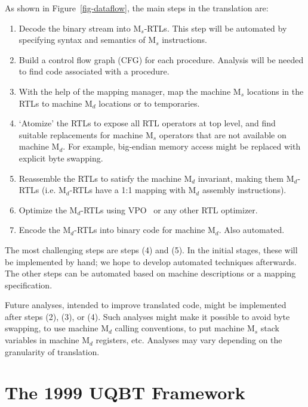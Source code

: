 As shown in Figure~\ref{fig-dataflow}, the main steps in the translation are:
\begin{enumerate}
\item Decode the binary stream into M$_s$-RTLs.  This step will be
     automated by specifying syntax and semantics of M$_s$ instructions.

\item Build a control flow graph (CFG) for each procedure.  Analysis
     will be needed to find code associated with a procedure.

\item With the help of the mapping manager, map the machine M$_s$ locations
     in the RTLs to machine M$_d$ locations or to temporaries.

\item `Atomize' the RTLs to expose all RTL operators at top level, and
     find suitable replacements for machine M$_s$ operators that are not
     available on machine M$_d$.  For example, big-endian memory access
     might be replaced with explicit byte swapping.

\item Reassemble the RTLs to satisfy the machine M$_d$ invariant, making
	them M$_d$-RTLs (i.e. M$_d$-RTLs have a 1:1 mapping with M$_d$ 
	assembly instructions).

\item Optimize the M$_d$-RTLs using VPO~\cite{Beni88} or any other RTL 
	optimizer.

\item Encode the M$_d$-RTLs into binary code for machine M$_d$.  Also automated.
\end{enumerate}

The most challenging steps are steps (4) and (5).  In the initial
stages, these will be implemented by hand; we hope to develop automated
techniques afterwards.  The other steps can be automated based on
machine descriptions or a mapping specification.

Future analyses, intended to improve translated code, might be
implemented after steps (2), (3), or (4).  Such analyses might make it
possible to avoid byte swapping, to use machine M$_d$ calling conventions,
to put machine M$_s$ stack variables in machine M$_d$ registers, etc.
Analyses may vary depending on the granularity of translation.


\section{The 1999 UQBT Framework}
\label{sec-framework}

